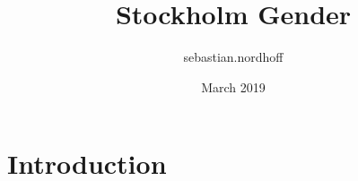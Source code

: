 \documentclass{article}
\title{Stockholm Gender}
\author{sebastian.nordhoff }
\date{March 2019}
\begin{document}
\maketitle

\section{Introduction}
\end{document}
